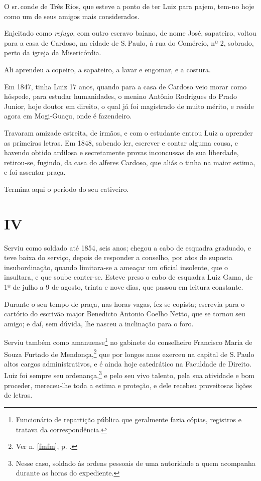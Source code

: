 O sr.\,conde de Três Rios, que esteve a ponto de ter Luiz para pajem,
tem-no hoje como um de seus amigos mais considerados.

Enjeitado como \emph{refugo}, com outro escravo baiano, de nome José,
sapateiro, voltou para a casa de Cardoso, na cidade de S.\,Paulo, à rua
do Comércio, nº 2, sobrado, perto da igreja da Misericórdia.

Ali aprendeu a copeiro, a sapateiro, a lavar e engomar, e a costura.

Em 1847, tinha Luiz 17 anos, quando para a casa de Cardoso veio morar
como hóspede, para estudar humanidades, o menino Antônio Rodrigues do
Prado Junior, hoje doutor em direito, o qual já foi magistrado de muito
mérito, e reside agora em Mogi-Guaçu, onde é fazendeiro.

Travaram amizade estreita, de irmãos, e com o estudante entrou Luiz a
aprender as primeiras letras. Em 1848, sabendo ler, escrever e contar
alguma cousa, e havendo obtido ardilosa e secretamente provas
inconcussas de sua liberdade, retirou-se, fugindo, da casa do alferes
Cardoso, que aliás o tinha na maior estima, e foi assentar praça.

Termina aqui o período do seu cativeiro.

\section*{IV}

Serviu como soldado até 1854, seis anos; chegou a cabo de esquadra
graduado, e teve baixa do serviço, depois de responder a conselho, por
atos de suposta insubordinação, quando limitara-se a ameaçar um oficial
insolente, que o insultara, e que soube conter-se. Esteve preso o cabo
de esquadra Luiz Gama, de 1º de julho a 9 de agosto, trinta e nove dias,
que passou em leitura constante.

Durante o seu tempo de praça, nas horas vagas, fez-se copista; escrevia
para o cartório do escrivão major Benedicto Antonio Coelho Netto, que se
tornou seu amigo; e daí, sem dúvida, lhe nasceu a inclinação para o
foro.

Serviu também como amanuense\footnote{Funcionário de repartição
  pública que geralmente fazia cópias, registros e tratava da
  correspondência.} no gabinete do conselheiro Francisco Maria de Souza
Furtado de Mendonça,\footnote{Ver n. \ref{fmfm}, p. \pageref{fmfm}.} que por longos anos exerceu na capital de S.\,Paulo
altos cargos administrativos, e é ainda hoje catedrático na Faculdade de
Direito. Luiz foi sempre seu ordenança,\footnote{Nesse caso, soldado às
  ordens pessoais de uma autoridade a quem acompanha durante as horas do
  expediente.} e pelo seu vivo talento, pela sua atividade e bom
proceder, mereceu-lhe toda a estima e proteção, e dele recebeu
proveitosas lições de letras.


